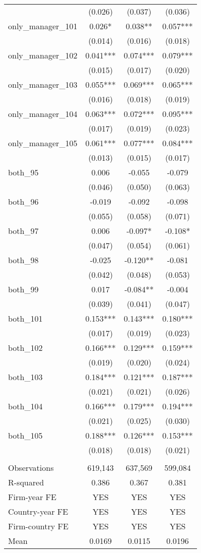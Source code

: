 \begin{tabular}{lccc}
 & (0.026) & (0.037) & (0.036) \\
only\_manager\_101 & 0.026* & 0.038** & 0.057*** \\
 & (0.014) & (0.016) & (0.018) \\
only\_manager\_102 & 0.041*** & 0.074*** & 0.079*** \\
 & (0.015) & (0.017) & (0.020) \\
only\_manager\_103 & 0.055*** & 0.069*** & 0.065*** \\
 & (0.016) & (0.018) & (0.019) \\
only\_manager\_104 & 0.063*** & 0.072*** & 0.095*** \\
 & (0.017) & (0.019) & (0.023) \\
only\_manager\_105 & 0.061*** & 0.077*** & 0.084*** \\
 & (0.013) & (0.015) & (0.017) \\
both\_95 & 0.006 & -0.055 & -0.079 \\
 & (0.046) & (0.050) & (0.063) \\
both\_96 & -0.019 & -0.092 & -0.098 \\
 & (0.055) & (0.058) & (0.071) \\
both\_97 & 0.006 & -0.097* & -0.108* \\
 & (0.047) & (0.054) & (0.061) \\
both\_98 & -0.025 & -0.120** & -0.081 \\
 & (0.042) & (0.048) & (0.053) \\
both\_99 & 0.017 & -0.084** & -0.004 \\
 & (0.039) & (0.041) & (0.047) \\
both\_101 & 0.153*** & 0.143*** & 0.180*** \\
 & (0.017) & (0.019) & (0.023) \\
both\_102 & 0.166*** & 0.129*** & 0.159*** \\
 & (0.019) & (0.020) & (0.024) \\
both\_103 & 0.184*** & 0.121*** & 0.187*** \\
 & (0.021) & (0.021) & (0.026) \\
both\_104 & 0.166*** & 0.179*** & 0.194*** \\
 & (0.021) & (0.025) & (0.030) \\
both\_105 & 0.188*** & 0.126*** & 0.153*** \\
 & (0.018) & (0.018) & (0.021) \\
 &  &  &  \\
Observations & 619,143 & 637,569 & 599,084 \\
R-squared & 0.386 & 0.367 & 0.381 \\
Firm-year FE & YES & YES & YES \\
Country-year FE & YES & YES & YES \\
Firm-country FE & YES & YES & YES \\
 Mean & 0.0169 & 0.0115 & 0.0196 \\ \hline
\end{tabular}
